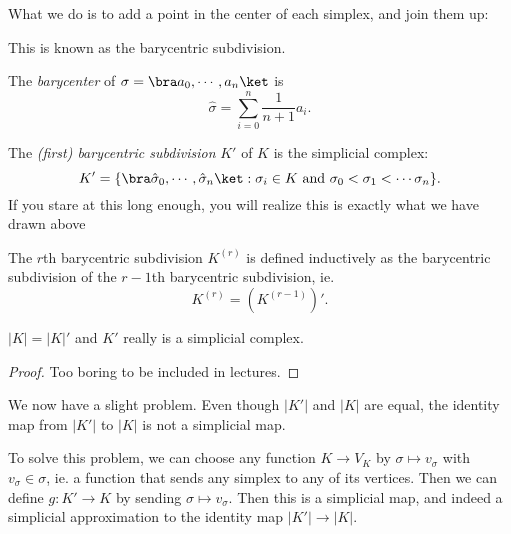 \documentclass[a4paper]{article}
\begin{document}
What we do is to add a point in the center of each simplex, and join them up:
\begin{center}
\end{center}
This is known as the barycentric subdivision.
\begin{defi}[Barycenter]
  The \emph{barycenter} of $\sigma = \bra a_0, \cdots, a_n\ket$ is
  \[
    \hat{\sigma} = \sum_{i = 0}^n \frac{1}{n + 1} a_i.
  \]
\end{defi}

\begin{defi}
  The \emph{(first) barycentric subdivision} $K'$ of $K$ is the simplicial complex:
  \[
    K' = \{\bra \hat{\sigma}_0, \cdots, \hat{\sigma}_n\ket: \sigma_i \in K\text{ and }\sigma_0 < \sigma_1 < \cdots \sigma_n\}.
  \]
  If you stare at this long enough, you will realize this is exactly what we have drawn above

  The $r$th barycentric subdivision $K^{(r)}$ is defined inductively as the barycentric subdivision of the $r - 1$th barycentric subdivision, ie.
  \[
    K^{(r)} = (K^{(r - 1)})'.
  \]
\end{defi}

\begin{prop}
  $|K| = |K|'$ and $K'$ really is a simplicial complex.
\end{prop}

\begin{proof}
  Too boring to be included in lectures.
\end{proof}

We now have a slight problem. Even though $|K'|$ and $|K|$ are equal, the identity map from $|K'|$ to $|K|$ is not a simplicial map.

To solve this problem, we can choose any function $K \to V_K$ by $\sigma \mapsto v_\sigma$ with $v_\sigma \in \sigma$, ie. a function that sends any simplex to any of its vertices. Then we can define $g: K' \to K$ by sending $\hat{\sigma} \mapsto v_\sigma$. Then this is a simplicial map, and indeed a simplicial approximation to the identity map $|K'| \to |K|$.
\end{document}
